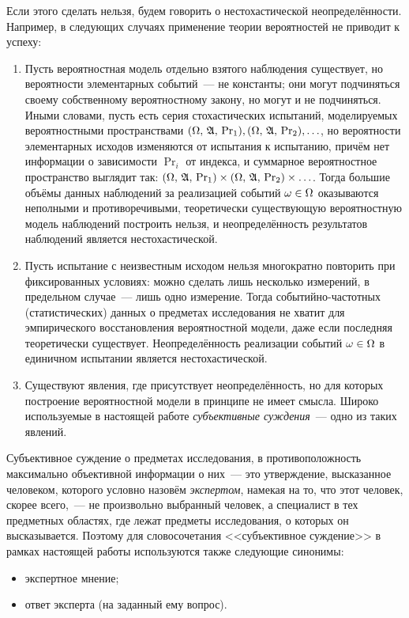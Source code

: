 Если этого сделать нельзя, будем говорить о нестохастической неопределённости. Например, в следующих случаях применение теории вероятностей не приводит к успеху:
\begin{enumerate}
  \item Пусть вероятностная модель отдельно взятого наблюдения существует, но вероятности элементарных событий~--- не константы; они могут  подчиняться своему собственному вероятностному закону, но могут и не подчиняться. Иными словами, пусть есть серия стохастических испытаний, моделируемых вероятностными пространствами ${(\Omega,\, {\mathfrak{A}},\,{\mathrm{Pr}}_{1})}, {(\Omega,\, {\mathfrak{A}},\,{\mathrm{Pr}}_{2})}, \ldots$, но вероятности элементарных исходов изменяются от испытания к испытанию, причём нет информации о зависимости $\Pr_{i}$ от индекса, и суммарное вероятностное пространство выглядит так: ${(\Omega,\, {\mathfrak{A}},\,{\mathrm{Pr}}_{1})} \times {(\Omega,\, {\mathfrak{A}},\,{\mathrm{Pr}}_{2})} \times \ldots$. Тогда большие объёмы данных наблюдений за реализацией событий $\omega \in \Omega$ оказываются неполными и противоречивыми, теоретически существующую вероятностную модель наблюдений построить нельзя, и неопределённость результатов наблюдений является нестохастической. 
  \item Пусть испытание с неизвестным исходом нельзя многократно повторить при фиксированных условиях: можно сделать лишь несколько измерений, в предельном случае~--- лишь одно измерение. Тогда событийно-частотных (статистических) данных о предметах исследования не хватит для эмпирического восстановления вероятностной модели, даже если последняя теоретически существует. Неопределённость реализации событий $\omega \in \Omega$ в единичном испытании является нестохастической. 
  \item {}Существуют явления, где присутствует неопределённость, но для которых построение вероятностной модели в принципе не имеет смысла. Широко используемые в настоящей работе {\sl субъективные суждения}~--- одно из таких явлений. 
\end{enumerate} 

Субъективное суждение о предметах исследования, в противоположность максимально объективной информации о них~--- это утверждение, высказанное человеком, которого  условно назовём {\sl экспертом}, намекая на то, что этот человек, скорее всего,~--- не произвольно выбранный человек, а специалист в тех предметных областях, где лежат предметы исследования, о которых он высказывается. Поэтому для словосочетания <<субъективное суждение>> в рамках настоящей работы используются также следующие синонимы: 
\begin{itemize}
	\item экспертное мнение;
	\item ответ эксперта (на заданный ему вопрос). 
 \end{itemize}
 
